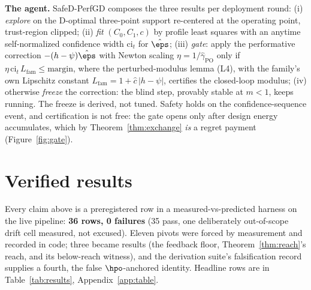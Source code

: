 \documentclass{article}
\begin{document}
\textbf{The agent.} SafeD-PerfGD composes the three results per deployment round: (i) \emph{explore} on the D-optimal three-point support re-centered at the operating point, trust-region clipped; (ii) \emph{fit} $(C_0, C_1, c)$ by profile least squares with an anytime self-normalized confidence width $\mathrm{ci}_t$ for $\hat\eps$; (iii) \emph{gate}: apply the performative correction $-(h-\psi)\hat\eps$ with Newton scaling $\eta = 1/\hat\gamma_{\mathrm{PO}}$ only if $\eta\,\mathrm{ci}_t\,L_{\mathrm{fam}} \le \text{margin}$, where the perturbed-modulus lemma (L4), with the family's own Lipschitz constant $L_{\mathrm{fam}} = 1 + \hat c\,|h - \psi|$, certifies the closed-loop modulus; (iv) otherwise \emph{freeze} the correction: the blind step, provably stable at $m<1$, keeps running. The freeze is derived, not tuned. Safety holds on the confidence-sequence event, and certification is not free: the gate opens only after design energy accumulates, which by Theorem~\ref{thm:exchange} \emph{is} a regret payment (Figure~\ref{fig:gate}).

\section{Verified results}
\label{sec:experiments}

Every claim above is a preregistered row in a measured-vs-predicted harness on the live pipeline: \textbf{36 rows, 0 failures} (35 pass, one deliberately out-of-scope drift cell measured, not excused). Eleven pivots were forced by measurement and recorded in code; three became results (the feedback floor, Theorem~\ref{thm:reach}'s reach, and its below-reach witness), and the derivation suite's falsification record supplies a fourth, the false $\hpo$-anchored identity. Headline rows are in Table~\ref{tab:results}, Appendix~\ref{app:table}.
\end{document}
